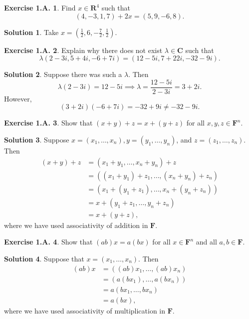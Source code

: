 \documentclass[12pt]{article}
\theoremstyle{definition}
\theoremstyle{exercise}
\newtheorem{exercise}{Exercise 1.A.}
\theoremstyle{solution}
\newtheorem*{solution}{Solution}
\newcommand{\R}{\mathbf{R}}
\newcommand{\C}{\mathbf{C}}
\newcommand{\F}{\mathbf{F}}
\begin{document}
\begin{exercise}
\label{ex:10}
    Find \( x \in \R^4 \) such that
    \[
        (4, -3, 1, 7) + 2x = (5, 9, -6, 8).
    \]
\end{exercise}

\begin{solution}
    Take \( x = (\tfrac{1}{2}, 6, -\tfrac{7}{2}, \tfrac{1}{2}) \).
\end{solution}

\begin{exercise}
\label{ex:11}
    Explain why there does not exist \( \lambda \in \C \) such that
    \[
        \lambda (2 - 3i, 5 + 4i, -6 + 7i) = (12 - 5i, 7 + 22i, -32 - 9i).
    \]
\end{exercise}

\begin{solution}
    Suppose there was such a \( \lambda \). Then
    \[
        \lambda (2 - 3i) = 12 - 5i \implies \lambda = \frac{12 - 5i}{2 - 3i} = 3 + 2i.
    \]
    However,
    \[
        (3 + 2i)(-6 + 7i) = -32 + 9i \neq -32 - 9i.
    \]
\end{solution}

\begin{exercise}
\label{ex:12}
    Show that \( (x + y) + z = x + (y + z) \) for all \( x, y, z \in \F^n \).
\end{exercise}

\begin{solution}
    Suppose \( x = (x_1, \ldots, x_n), y = (y_1, \ldots, y_n) \), and \( z = (z_1, \ldots, z_n) \). Then
    \begin{align*}
        (x + y) + z &= (x_1 + y_1, \ldots, x_n + y_n) + z \\
        &= ((x_1 + y_1) + z_1, \ldots, (x_n + y_n) + z_n) \\
        &= (x_1 + (y_1 + z_1), \ldots, x_n + (y_n + z_n)) \\
        &= x + (y_1 + z_1, \ldots, y_n + z_n) \\
        &= x + (y + z),
    \end{align*}
    where we have used associativity of addition in \( \F \).
\end{solution}

\begin{exercise}
\label{ex:13}
    Show that \( (ab)x = a(bx) \) for all \( x \in \F^n \) and all \( a, b \in \F \).
\end{exercise}

\begin{solution}
    Suppose that \( x = (x_1, \ldots, x_n) \). Then
    \begin{align*}
        (ab)x &= ((ab)x_1, \ldots, (ab)x_n) \\
        &= (a(b x_1), \ldots, a(b x_n)) \\
        &= a(b x_1, \ldots, b x_n) \\
        &= a(bx),
    \end{align*}
    where we have used associativity of multiplication in \( \F \).
\end{solution}
\end{document}
